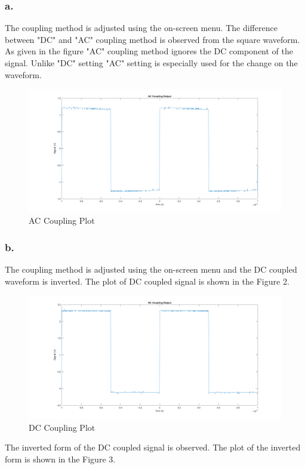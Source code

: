 \documentclass[letterpaper,12pt]{article}
\begin{document}
\subsubsection{a.}
The coupling method is adjusted using the on-screen menu. The difference between "DC" and "AC" coupling method is observed from the square waveform. As given in the figure "AC" coupling method ignores the DC component of the signal. Unlike "DC" setting "AC" setting is especially used for the change on the waveform.
\begin{figure}[h]
	\caption{AC Coupling Plot}
	\centering
	\includegraphics[width=1\textwidth]{2a.png}
\end{figure}

\subsubsection{b.}
The coupling method is adjusted using the on-screen menu and the DC coupled waveform is inverted. The plot of DC coupled signal is shown in the Figure 2.

\begin{figure}[h]
	\caption{DC Coupling Plot}
	\centering
	\includegraphics[width=1\textwidth]{2b1.png}
\end{figure}
The inverted form of the DC coupled signal is observed. The plot of the inverted form is shown in the Figure 3.
\end{document}

